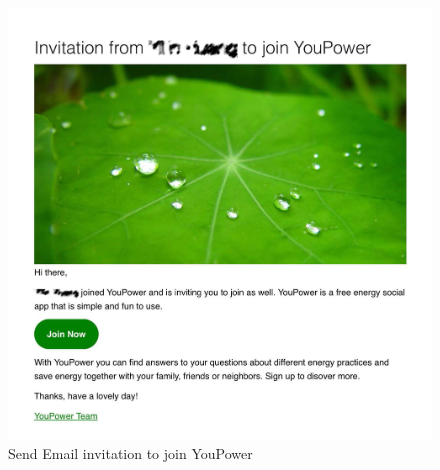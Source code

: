 \documentclass[a4paper,10pt]{article}
\begin{document}
\begin{figure}[h!]
\begin{center}
\begin{minipage}[t!]{0.6\linewidth}
         \includegraphics[width=1\linewidth]{img/invite2.jpg}    
        \end{minipage}
      \end{center}\caption{Send Email invitation to join YouPower }\label{fig:invite}
\end{figure}
\end{document}
